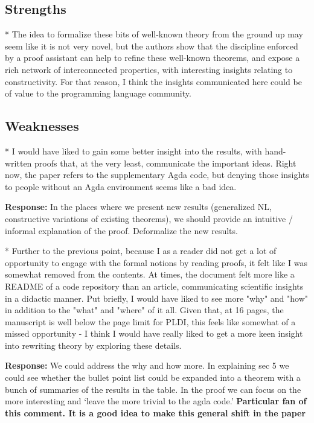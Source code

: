 \documentclass[11pt]{article}
\newcommand{\res}[1]{\par\noindent\textbf{Response:} #1\par}
\begin{document}
\subsection*{Strengths}

* The idea to formalize these bits of well-known theory from the ground up may
seem like it is not very novel, but the authors show that the discipline
enforced by a proof assistant can help to refine these well-known theorems,
and expose a rich network of interconnected properties, with interesting
insights relating to constructivity. For that reason, I think the insights
communicated here could be of value to the programming language community.

\subsection*{Weaknesses}

* I would have liked to gain some better insight into the results, with
hand-written proofs that, at the very least, communicate the important ideas.
Right now, the paper refers to the supplementary Agda code, but denying those
insights to people without an Agda environment seems like a bad idea.
\res{In the places where we present new results (generalized NL, constructive variations of existing theorems), we should provide an intuitive / informal explanation of the proof. Deformalize the new results.}
* Further to the previous point, because I as a reader did not get a lot of
opportunity to engage with the formal notions by reading proofs, it felt like
I was somewhat removed from the contents. At times, the document felt more
like a README of a code repository than an article, communicating scientific
insights in a didactic manner. Put briefly, I would have liked to see more
"why" and "how" in addition to the "what" and "where" of it all. Given that,
at 16 pages, the manuscript is well below the page limit for PLDI, this feels
like somewhat of a missed opportunity - I think I would have really liked to
get a more keen insight into rewriting theory by exploring these details.
\res{We could address the why and how more. In explaining sec 5 we could see whether the bullet point list could be expanded into a theorem with a bunch of summaries of the results in the table. In the proof we can focus on the more interesting and `leave the more trivial to the agda code.' \textbf{Particular fan of this comment. It is a good idea to make this general shift in the paper}}
\end{document}
